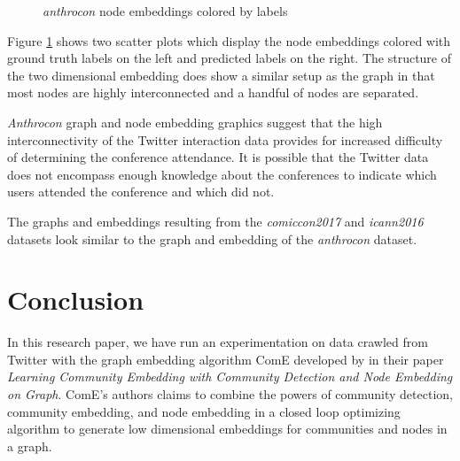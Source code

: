 \documentclass[sigconf]{acmart}
\begin{document}
\begin{figure}[H]
    \caption{\textit{anthrocon} node embeddings colored by labels}
    \label{node_embeddings}
\end{figure}

Figure \ref{node_embeddings} shows two scatter plots which display the node embeddings colored with ground truth labels on the left and predicted labels on the right. The structure of the two dimensional embedding does show a similar setup as the graph in that most nodes are highly interconnected and a handful of nodes are separated.

\textit{Anthrocon} graph and node embedding graphics suggest that the high interconnectivity of the Twitter interaction data provides for increased difficulty of determining the conference attendance. It is possible that the Twitter data does not encompass enough knowledge about the conferences to indicate which users attended the conference and which did not.

The graphs and embeddings resulting from the \textit{comiccon2017} and  \textit{icann2016} datasets look similar to the graph and embedding of the \textit{anthrocon} dataset.

\section{Conclusion}

In this research paper, we have run an experimentation on data crawled from Twitter with the graph embedding algorithm ComE developed by \citeauthor{Cav17} in their \citeyear{Cav17} paper \textit{Learning Community Embedding with Community Detection and Node Embedding on Graph}. ComE's authors claims to combine the powers of community detection, community embedding, and node embedding in a closed loop optimizing algorithm to generate low dimensional embeddings for communities and nodes in a graph.
\end{document}
